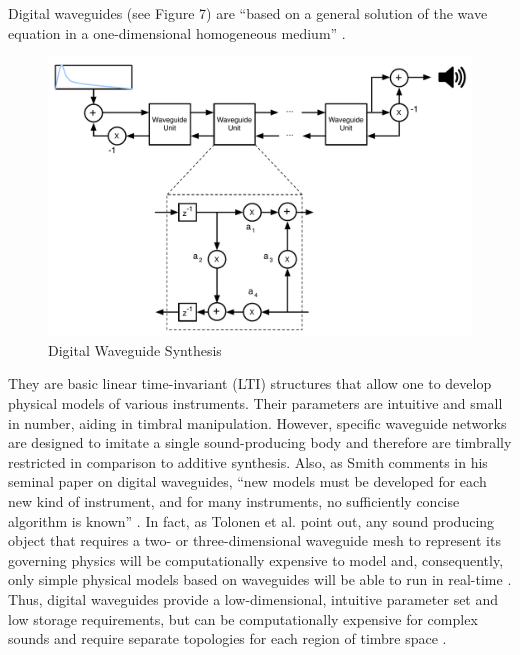 \documentclass[12pt]{report} 	%
\numberwithin{figure}{chapter}
\numberwithin{table}{chapter}
\numberwithin{equation}{chapter}
\begin{document}
\begin{flushleft}
Digital waveguides (see Figure 7) are ``based on a general solution of the wave equation in a one-dimensional homogeneous medium'' \cite[p. 63]{Tolonen:1998bh}. 
\begin{figure}[h!]
\begin{center}
\includegraphics[scale=0.55]{DigitalWaveguideSynthesis}
\caption[Digital waveguide synthesis]{Digital Waveguide Synthesis}
\end{center}
\vspace{6pt}
\end{figure}
They are basic linear time-invariant (LTI) structures that allow one to develop physical models of various instruments. Their parameters are intuitive and small in number, aiding in timbral manipulation. However, specific waveguide networks are designed to imitate a single sound-producing body and therefore are timbrally restricted in comparison to additive synthesis. Also, as Smith comments in his seminal paper on digital waveguides, ``new models must be developed for each new kind of instrument, and for many instruments, no sufficiently concise algorithm is known'' \cite[p. 86]{III:1992zn}. In fact, as Tolonen et al. point out, any sound producing object that requires a two- or three-dimensional waveguide mesh to represent its governing physics will be computationally expensive to model and, consequently, only simple physical models based on waveguides will be able to run in real-time \cite[p. 99-100]{Tolonen:1998bh}. Thus, digital waveguides provide a low-dimensional, intuitive parameter set and low storage requirements, but can be computationally expensive for complex sounds and require separate topologies for each region of timbre space \cite[p. 50]{Nicol:2005rp}.


\end{flushleft}
\end{document}
